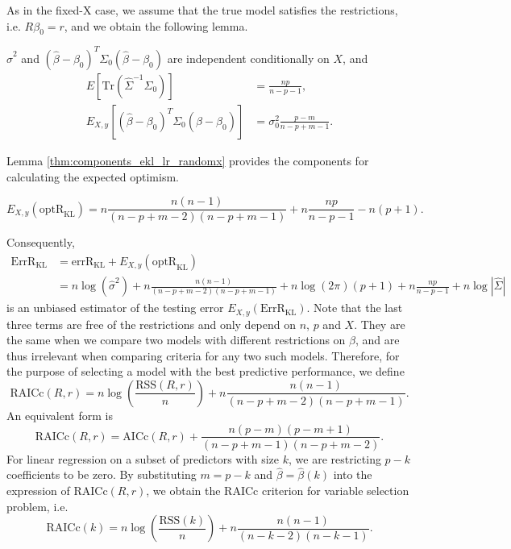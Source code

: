 As in the fixed-X case, we assume that the true model satisfies the restrictions, i.e. $R\beta_0=r$, and we obtain the following lemma.
\begin{lemma}
$\hat\sigma^2$ and $(\hat{\beta}-\beta_0)^T \Sigma_0 (\hat{\beta}-\beta_0)$ are independent conditionally on $X$, and 
\begin{equation*}
\begin{aligned}
E \left[ \text{Tr}(\hat \Sigma^{-1}\Sigma_0) \right] &= \frac{np}{n-p-1},\\
E_{X,y}  \left [ (\hat \beta-\beta_0)^T \Sigma_0 (\hat \beta-\beta_0) \right ] &= \sigma_0^2 \frac{p-m}{n-p+m-1}.
\end{aligned}
\end{equation*}
\label{thm:components_ekl_lr_randomx}
\end{lemma}
Lemma \ref{thm:components_ekl_lr_randomx} provides the components for calculating the expected optimism.
\begin{theorem}
\begin{equation*}
E_{X,y}(\text{optR}_\text{KL}) = n \frac{n(n-1)}{(n-p+m-2)(n-p+m-1)} + n \frac{np}{n-p-1} - n(p+1).
\end{equation*}
\label{thm:EoptR_KL}
\end{theorem}

Consequently, 
\begin{equation*}
\begin{aligned}
\widehat{\text{ErrR}}_\text{KL} &= \text{errR}_\text{KL} + E_{X,y} (\text{optR}_\text{KL}) \\
&=n\log \left(\hat\sigma^2\right) + n \frac{n(n-1)}{(n-p+m-2)(n-p+m-1)} + n\log(2\pi)(p+1) + n\frac{np}{n-p-1} + n\log|\hat\Sigma|
\end{aligned}
\end{equation*}
is an unbiased estimator of the testing error $E_{X,y}(\text{ErrR}_\text{KL})$. Note that the last three terms are free of the restrictions and only depend on $n$, $p$ and $X$. They are the same when we compare two models with different restrictions on $\beta$, and are thus irrelevant when comparing criteria for any two such models. Therefore, for the purpose of selecting a model with the best predictive performance, we define
\begin{equation*}
\text{RAICc}(R,r) = n\log \left(\frac{\text{RSS}(R,r)}{n}\right) + n \frac{n(n-1)}{(n-p+m-2)(n-p+m-1)}.
\end{equation*}
An equivalent form is
\begin{equation*}
\text{RAICc}(R,r) = \text{AICc}(R,r) + \frac{n(p-m)(p-m+1)}{(n-p+m-1)(n-p+m-2)}.
\end{equation*} 
For linear regression on a subset of predictors with size $k$, we are restricting $p-k$ coefficients to be zero. By substituting $m=p-k$ and $\hat\beta = \hat\beta(k)$ into the expression of $\text{RAICc}(R,r)$, we obtain the RAICc criterion for variable selection problem, i.e.
\begin{equation*}
\text{RAICc}(k) = n\log \left(\frac{\text{RSS}(k)}{n}\right) + n \frac{n(n-1)}{(n-k-2)(n-k-1)}.
\end{equation*}

